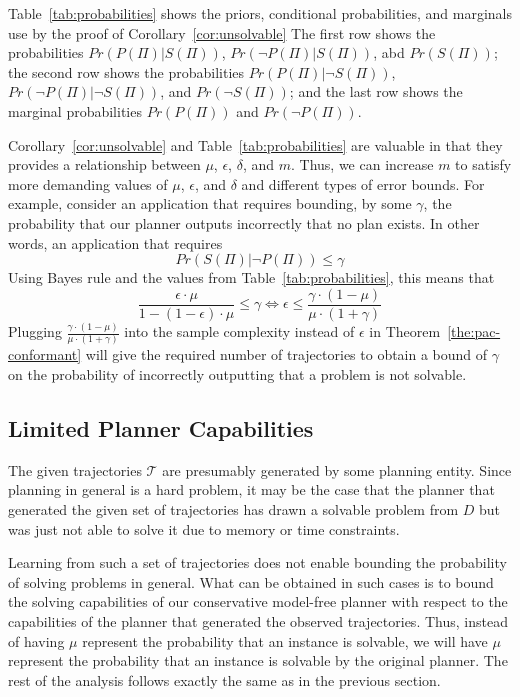 \documentclass{article}
\newcommand{\solvable}{\textit{S}}
\newcommand{\plannable}{\textit{P}}
\begin{document}
Table~\ref{tab:probabilities} shows the priors, conditional probabilities, and marginals use by the proof of Corollary~\ref{cor:unsolvable}
The first row shows the probabilities 
	$Pr(\plannable(\Pi)|\solvable(\Pi))$, 
	$Pr(\neg\plannable(\Pi)|\solvable(\Pi))$, abd
	$Pr(\solvable(\Pi))$; 
	the second row shows the probabilities 
	$Pr(\plannable(\Pi)|\neg\solvable(\Pi))$, 
	$Pr(\neg\plannable(\Pi)|\neg\solvable(\Pi))$, and
	$Pr(\neg\solvable(\Pi))$;  	
	and the last row shows the marginal probabilities
	$Pr(\plannable(\Pi))$ and  
	$Pr(\neg\plannable(\Pi))$. 
	
	Corollary~\ref{cor:unsolvable} and Table~\ref{tab:probabilities} are valuable in that they provides a relationship between $\mu$, $\epsilon$, $\delta$, and $m$. Thus, we can increase $m$ to satisfy more demanding values of $\mu$, $\epsilon$, and $\delta$ and different types of error bounds. For example, consider an application that requires bounding, by some $\gamma$, the probability that our planner outputs incorrectly that no plan exists. In other words, an application that requires 
	\[ Pr(\solvable(\Pi)|\neg\plannable(\Pi))\leq \gamma \]
	Using Bayes rule and the values from Table~\ref{tab:probabilities}, this means that 
	\[ \frac{\epsilon\cdot\mu}{1-(1-\epsilon)\cdot\mu}\leq \gamma \Leftrightarrow  \epsilon\leq \frac{\gamma\cdot (1-\mu)}{\mu\cdot (1+\gamma)}\]
	\noindent Plugging $\frac{\gamma\cdot (1-\mu)}{\mu\cdot (1+\gamma)}$ into the sample complexity instead of $\epsilon$ in Theorem~\ref{the:pac-conformant} will give the required number of trajectories to obtain a bound of  $\gamma$ on the probability of incorrectly outputting that a problem is not solvable. 
	
	\subsection{Limited Planner Capabilities}
	The given trajectories $\mathcal{T}$ are presumably generated by some planning entity. Since planning in general is a hard problem, it may be the case that the planner that generated the given set of trajectories has drawn a solvable problem from $D$ but was just not able to solve it due to memory or time constraints. 
	
	Learning from such a set of trajectories does not enable bounding the probability of solving problems in general. What can be obtained in such cases is to bound the solving capabilities of our conservative model-free planner with respect to the capabilities of the planner that generated the observed trajectories. Thus, instead of having $\mu$ represent the probability that an instance is solvable, we will have $\mu$ represent the probability that an instance is solvable by the original planner. The rest of the analysis follows exactly the same as in the previous section.
	
\end{document}
